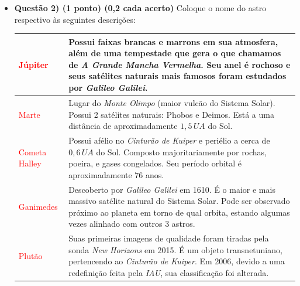 \documentclass[a4paper, 12pt]{article}
\newcommand{\red}[1]{\textcolor{red}{#1}}
\begin{document}
\begin{flushleft}
\begin{itemize}
		\item \textbf{Questão 2) (1 ponto) (0,2 cada acerto)} Coloque o nome do astro respectivo às seguintes descrições:
			\begin{center} \begin{tabular}{|M{0.2\textwidth}|M{0.65\textwidth}|}
				\hline
				\red{Júpiter} & Possui faixas brancas e marrons em sua atmosfera, além de uma tempestade que gera o que chamamos de \textit{A Grande Mancha Vermelha}. Seu anel é rochoso e seus satélites naturais mais famosos foram estudados por \textit{Galileo Galilei}. \\ \hline
				\red{Marte} & Lugar do \textit{Monte Olimpo} (maior vulcão do Sistema Solar). Possui 2 satélites naturais: Phobos e Deimos. Está a uma distância de aproximadamente $1,5 \, UA$ do Sol. \\ \hline
				\red{Cometa Halley} & Possui afélio no \textit{Cinturão de Kuiper} e periélio a cerca de $0,6 \, UA$ do Sol. Composto majoritariamente por rochas, poeira, e gases congelados. Seu período orbital é aproximadamente $76$ anos. \\ \hline
				\red{Ganimedes} & Descoberto por \textit{Galileo Galilei} em 1610. É o maior e mais massivo satélite natural do Sistema Solar. Pode ser observado próximo ao planeta em torno de qual orbita, estando algumas vezes alinhado com outros 3 astros.  \\ \hline
				\red{Plutão} & Suas primeiras imagens de qualidade foram tiradas pela sonda \textit{New Horizons} em 2015. É um objeto transnetuniano, pertencendo ao \textit{Cinturão de Kuiper}. Em 2006, devido a uma redefinição feita pela \textit{IAU}, sua classificação foi alterada. \\ \hline
			\end{tabular} \end{center}


\end{itemize}
\end{flushleft}
\end{document}
